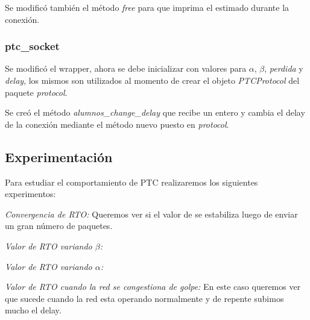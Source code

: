     Se modific\'o tambi\'en el m\'etodo \textit{free} para que imprima el \rto{} 
    estimado durante la conexi\'on.        
    
    \subsubsection{ptc\_socket}
    Se modific\'o el wrapper, ahora se debe inicializar con valores para 
    $\alpha$, $\beta$, \textit{perdida} y \textit{delay}, los mismos son
    utilizados al momento de crear el objeto \textit{PTCProtocol} del 
    paquete \textit{protocol}.
    
    Se cre\'o el m\'etodo \textit{alumnos\_change\_delay} que recibe un
    entero y cambia el delay de la conexi\'on mediante el m\'etodo nuevo
    puesto en \textit{protocol}.
    
  \subsection{Experimentaci\'on}  
    Para estudiar el comportamiento de PTC realizaremos los siguientes
    experimentos:
    
    \emph{Convergencia de RTO:} Queremos ver si el valor de \rto{} se
    estabiliza luego de enviar un gran n\'umero de paquetes.
  
    \emph{Valor de RTO variando $\beta$:}
    
    \emph{Valor de RTO variando $\alpha$:}
    
    \emph{Valor de RTO cuando la red se congestiona de golpe:} En este
    caso queremos ver que sucede cuando la red esta operando normalmente
    y de repente subimos mucho el delay.
